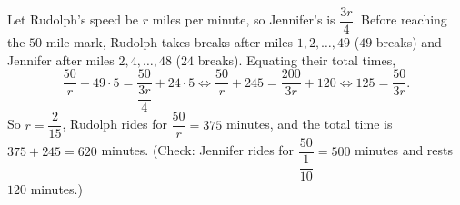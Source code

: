 Let Rudolph's speed be $r$ miles per minute, so Jennifer's is $\dfrac{3r}{4}$. Before reaching the $50$-mile mark, Rudolph takes breaks after miles $1,2,\dots,49$ ($49$ breaks) and Jennifer after miles $2,4,\dots,48$ ($24$ breaks). Equating their total times,
\[
\dfrac{50}{r}+49\cdot5=\dfrac{50}{\dfrac{3r}{4}}+24\cdot5\iff\dfrac{50}{r}+245=\dfrac{200}{3r}+120\iff125=\dfrac{50}{3r}.
\]
So $r=\dfrac{2}{15}$, Rudolph rides for $\dfrac{50}{r}=375$ minutes, and the total time is $375+245=\boxed{620}$ minutes. (Check: Jennifer rides for $\dfrac{50}{\dfrac{1}{10}}=500$ minutes and rests $120$ minutes.)
